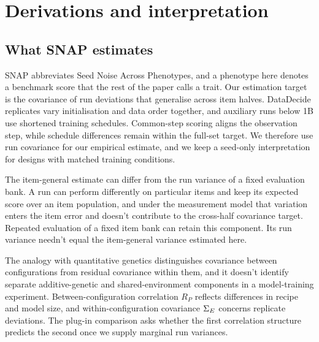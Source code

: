 \section{Derivations and interpretation}
\label{app:derivations}
\subsection{What SNAP estimates}
SNAP abbreviates Seed Noise Across Phenotypes, and a phenotype here denotes a benchmark score that the rest of the paper calls a trait. Our estimation target is the covariance of run deviations that generalise across item halves. DataDecide replicates vary initialisation and data order together, and auxiliary runs below 1B use shortened training schedules. Common-step scoring aligns the observation step, while schedule differences remain within the full-set target. We therefore use run covariance for our empirical estimate, and we keep a seed-only interpretation for designs with matched training conditions.

The item-general estimate can differ from the run variance of a fixed evaluation bank. A run can perform differently on particular items and keep its expected score over an item population, and under the measurement model that variation enters the item error and doesn't contribute to the cross-half covariance target. Repeated evaluation of a fixed item bank can retain this component. Its run variance needn't equal the item-general variance estimated here.

The analogy with quantitative genetics distinguishes covariance between configurations from residual covariance within them, and it doesn't identify separate additive-genetic and shared-environment components in a model-training experiment. Between-configuration correlation $R_P$ reflects differences in recipe and model size, and within-configuration covariance $\Sigma_E$ concerns replicate deviations. The plug-in comparison asks whether the first correlation structure predicts the second once we supply marginal run variances.

